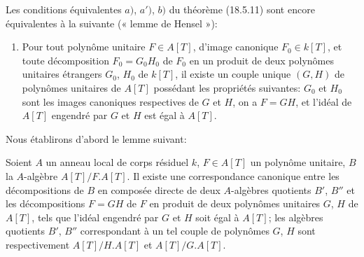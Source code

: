 \begin{remark}[18.5.13]
\label{IV.18.5.13}
Les conditions équivalentes $a)$, $a')$, $b)$ du théorème (18.5.11) sont encore équivalentes à la suivante (« lemme de Hensel »):
\begin{enumerate}
  \item[a'')] Pour tout polynôme unitaire $F\in A[T]$, d'image canonique $F_0\in k[T]$, et toute décomposition $F_0=G_0H_0$ de $F_0$ en un produit de deux polynômes unitaires étrangers $G_0$, $H_0$ de $k[T]$, il existe un couple unique $(G,H)$ de polynômes unitaires de $A[T]$ possédant les propriétés suivantes: $G_0$ et $H_0$ sont les images canoniques respectives de $G$ et $H$, on a $F=GH$, et l'idéal de $A[T]$ engendré par $G$ et $H$ est égal à $A[T]$.
\end{enumerate}
\end{remark}

Nous établirons d'abord le lemme suivant:

\begin{lemma}[18.5.13.1]
\label{IV.18.5.13.1}
Soient $A$ un anneau local de corps résiduel $k$, $F\in A[T]$ un polynôme unitaire, $B$ la $A$-algèbre $A[T]/F.A[T]$. Il existe une correspondance canonique entre les décompositions de $B$ en composée directe de deux $A$-algèbres quotients $B'$, $B''$ et les décompositions $F=GH$ de $F$ en produit de deux polynômes unitaires $G$, $H$ de $A[T]$, tels que l'idéal engendré par $G$ et $H$ soit égal à $A[T]$; les algèbres quotients $B'$, $B''$ correspondant à un tel couple de polynômes $G$, $H$ sont respectivement $A[T]/H.A[T]$ et $A[T]/G.A[T]$.
\end{lemma}

